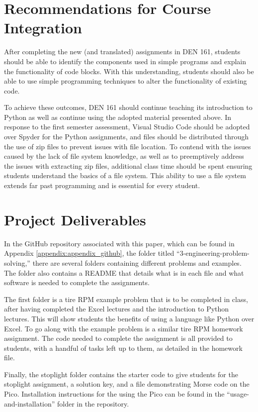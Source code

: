 \section{Recommendations for Course Integration}

After completing the new (and translated) assignments in DEN 161, students should be able to identify the components used in simple
programs and explain the functionality of code blocks. With this understanding, students should also be able
to use simple programming techniques to alter the functionality of existing code. 

To achieve these outcomes, DEN 161 should continue teaching its introduction to Python as well as continue
using the adopted material presented above. In response to the first semester assessment, Visual Studio
Code should be adopted over Spyder for the Python assignments, and files should be distributed through
the use of zip files to prevent issues with file location. To contend with the issues caused by the lack
of file system knowledge, as well as to preemptively address the issues with extracting zip files, additional
class time should be spent ensuring students understand the basics of a file system. This ability to use
a file system extends far past programming and is essential for every student.

\section{Project Deliverables}

In the GitHub repository associated with this paper, which can be found in Appendix \ref{appendix:appendix_github},
the folder titled ``3-engineering-problem-solving,'' there are several folders containing different problems and 
examples. The folder also contains a README that details what is in each file and what software is needed to 
complete the assignments. 

The first folder is a tire RPM example problem that is to be completed in class, after having completed the Excel
lectures and the introduction to Python lectures. This will show students the benefits of using a
language like Python over Excel. To go along with the example problem is a similar tire RPM homework assignment.
The code needed to complete the assignment is all provided to students, with a handful of tasks left up to them,
as detailed in the homework file. 

Finally, the stoplight folder contains the starter code to give students for the stoplight assignment, a solution
key, and a file demonstrating Morse code on the Pico. Installation instructions for the using the Pico can be found
in the ``usage-and-installation'' folder in the repository.

